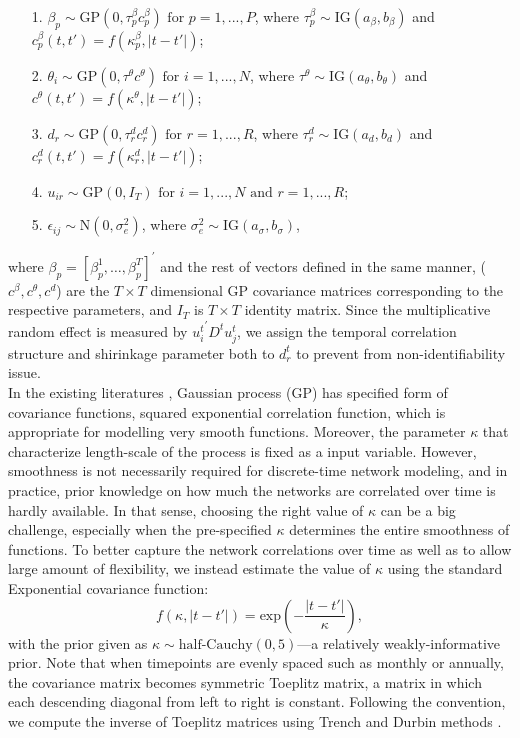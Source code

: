 \documentclass[a4paper]{article}
\begin{document}
\begin{center}
\begin{itemize}
	\item[1.] $\beta_{p}\sim \mbox{GP}(0, \tau^{\beta}_pc^\beta_{p})\mbox{ for }p = 1,...,P$, where $\tau^{\beta}_p \sim \mbox{IG}(a_\beta, b_\beta)$ and $c^\beta_p(t, t')=f(\kappa^\beta_{p}, |t-t'|)$;
	\item[2.] $\theta_{i}\sim \mbox{GP}(0, \tau^{\theta}c^\theta)\mbox{ for }i = 1,...,N$, where $\tau^{\theta}\sim \mbox{IG}(a_\theta, b_\theta)$ and $c^\theta(t, t')=f(\kappa^\theta, |t-t'|)$;
	\item[3.] $d_{r}\sim \mbox{GP}(0, \tau^{d}_r c^d_r)\mbox{ for }r = 1,...,R$, where $\tau_r^{d} \sim \mbox{IG}(a_d, b_d)$ and  $c^d_r(t, t')=f(\kappa^d_{r}, |t-t'|)$;
	\item[4.] $u_{ir}\sim\mbox{GP}(0, I_T)\mbox{ for }i = 1,...,N \mbox{ and } r=1,...,R$;
	\item[5.] $\epsilon_{ij} \sim \mbox{N}(0, \sigma_e^2)$, where $\sigma_e^2 \sim \mbox{IG}(a_\sigma, b_\sigma)$,
\end{itemize}
\end{center}
where $\beta_{p}= [\beta^1_{p},\ldots,\beta^T_{p}]^\prime$ and the rest of vectors defined in the same manner,  ($c^\beta, c^\theta, c^d$) are the $T\times T$ dimensional GP covariance matrices corresponding to the respective parameters, and $I_T$ is $T\times T$ identity matrix. Since the multiplicative random effect is measured by ${u^t_{i}}^\prime D^{t}u^t_{j}$, we assign the temporal correlation structure and shirinkage parameter both to $d^t_{r}$ to prevent from non-identifiability issue. \\ \newline
 In the existing literatures \citep{bhattacharya2011sparse,durante2013nonparametric,durante2014bayesian}, Gaussian process (GP) has specified form of covariance functions, squared exponential correlation function, which is appropriate for modelling very smooth functions. Moreover, the parameter $\kappa$ that characterize length-scale of the process is fixed as a input variable. However, smoothness is not necessarily required for discrete-time network modeling, and in practice, prior knowledge on how much the networks are correlated over time is hardly available. In that sense, choosing the right value of $\kappa$ can be a big challenge, especially when the pre-specified $\kappa$ determines the entire smoothness of functions. To better capture the network correlations over time as well as to allow large amount of flexibility, we instead estimate the value of $\kappa$ using the standard Exponential covariance function:
\begin{equation*}
f(\kappa, |t-t'|) = \mbox{exp}\left(-\frac{|t-t'|}{\kappa}\right),
\end{equation*}
with the prior given as $\kappa \sim \mbox{half-Cauchy}(0, 5)$---a relatively weakly-informative prior. Note that when timepoints are evenly spaced such as monthly or annually, the covariance matrix becomes symmetric Toeplitz matrix, a matrix in which each descending diagonal from left to right is constant.  Following the convention, we compute the inverse of Toeplitz matrices using Trench and Durbin methods \citep{golub2012matrix}. 
\end{document}
